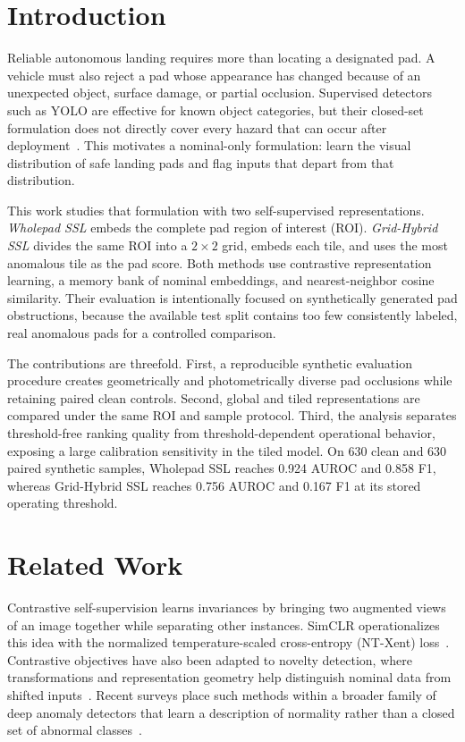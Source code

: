 \section{Introduction}
Reliable autonomous landing requires more than locating a designated pad. A vehicle must also reject a pad whose appearance has changed because of an unexpected object, surface damage, or partial occlusion. Supervised detectors such as YOLO are effective for known object categories, but their closed-set formulation does not directly cover every hazard that can occur after deployment~\cite{redmon2016,ruff2021}. This motivates a nominal-only formulation: learn the visual distribution of safe landing pads and flag inputs that depart from that distribution.

This work studies that formulation with two self-supervised representations. \emph{Wholepad SSL} embeds the complete pad region of interest (ROI). \emph{Grid-Hybrid SSL} divides the same ROI into a $2\times2$ grid, embeds each tile, and uses the most anomalous tile as the pad score. Both methods use contrastive representation learning, a memory bank of nominal embeddings, and nearest-neighbor cosine similarity. Their evaluation is intentionally focused on synthetically generated pad obstructions, because the available test split contains too few consistently labeled, real anomalous pads for a controlled comparison.

The contributions are threefold. First, a reproducible synthetic evaluation procedure creates geometrically and photometrically diverse pad occlusions while retaining paired clean controls. Second, global and tiled representations are compared under the same ROI and sample protocol. Third, the analysis separates threshold-free ranking quality from threshold-dependent operational behavior, exposing a large calibration sensitivity in the tiled model. On 630 clean and 630 paired synthetic samples, Wholepad SSL reaches 0.924 AUROC and 0.858 F1, whereas Grid-Hybrid SSL reaches 0.756 AUROC and 0.167 F1 at its stored operating threshold.

\section{Related Work}
Contrastive self-supervision learns invariances by bringing two augmented views of an image together while separating other instances. SimCLR operationalizes this idea with the normalized temperature-scaled cross-entropy (NT-Xent) loss~\cite{chen2020}. Contrastive objectives have also been adapted to novelty detection, where transformations and representation geometry help distinguish nominal data from shifted inputs~\cite{tack2020}. Recent surveys place such methods within a broader family of deep anomaly detectors that learn a description of normality rather than a closed set of abnormal classes~\cite{ruff2021,hojjati2022}.

